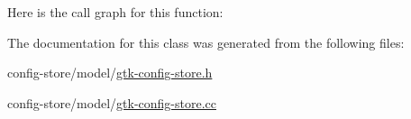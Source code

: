 Here is the call graph for this function\+:




The documentation for this class was generated from the following files\+:\begin{DoxyCompactItemize}
\item 
config-\/store/model/\hyperlink{gtk-config-store_8h}{gtk-\/config-\/store.\+h}\item 
config-\/store/model/\hyperlink{gtk-config-store_8cc}{gtk-\/config-\/store.\+cc}\end{DoxyCompactItemize}
